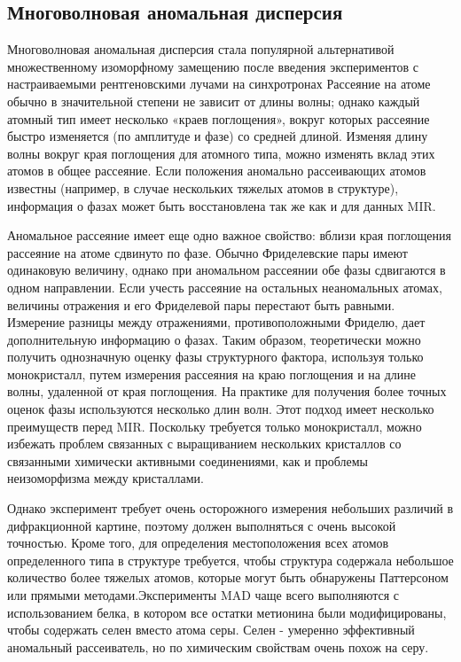 \documentclass{article}
\begin{document}
\subsection{Многоволновая аномальная дисперсия}

Многоволновая аномальная дисперсия стала популярной альтернативой множественному изоморфному замещению после введения экспериментов с настраиваемыми рентгеновскими лучами на синхротронах\cite{Hendrickson1997}
 Рассеяние на атоме обычно в значительной степени не зависит от длины волны; однако каждый атомный тип имеет несколько «краев поглощения», вокруг которых рассеяние быстро изменяется (по амплитуде и фазе) со средней длиной. Изменяя длину волны вокруг края поглощения для атомного типа, можно изменять вклад этих атомов в общее рассеяние.  Если положения аномально рассеивающих атомов известны  (например, в случае нескольких тяжелых атомов в структуре), информация о фазах может быть восстановлена так же как и для данных MIR\cite{Hendrickson1997}.

Аномальное рассеяние имеет еще одно важное свойство: вблизи края поглощения рассеяние на атоме сдвинуто по фазе. Обычно Фриделевские пары имеют одинаковую величину, однако при аномальном рассеянии обе фазы сдвигаются в одном направлении. Если учесть рассеяние на остальных неаномальных атомах, величины отражения и его Фриделевой пары перестают быть равными. Измерение разницы между отражениями, противоположными Фриделю, дает дополнительную информацию о фазах. Таким образом, теоретически можно получить однозначную оценку фазы структурного фактора, используя только монокристалл, путем измерения рассеяния на краю поглощения и на длине волны, удаленной от края поглощения. На практике для получения более точных оценок фазы используются несколько длин волн. Этот подход имеет несколько преимуществ перед MIR. Поскольку требуется только монокристалл, можно избежать проблем связанных с выращиванием нескольких кристаллов со связанными химически активными соединениями, как и проблемы неизоморфизма между кристаллами. 

Однако эксперимент требует очень осторожного измерения небольших различий в дифракционной картине, поэтому должен выполняться с очень высокой точностью. Кроме того, для определения местоположения всех атомов определенного типа в структуре требуется, чтобы структура содержала небольшое количество более тяжелых атомов, которые могут быть обнаружены Паттерсоном или прямыми методами.Эксперименты MAD чаще всего выполняются с использованием белка, в котором все остатки метионина были модифицированы, чтобы содержать селен вместо атома серы. Селен - умеренно эффективный аномальный рассеиватель, но по химическим свойствам очень похож на серу.
\end{document}
